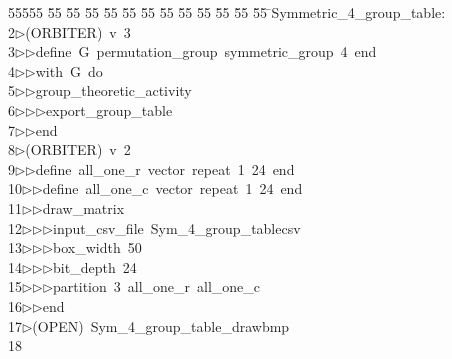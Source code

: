 %
%
\begin{tabbing}
55555 \= 55 \= 55 \= 55 \= 55 \= 55 \= 55 \= 55 \= 55 \= 55 \= 55 \= 55 \= 55 \= \>Symmetric\_4\_group\_table:\\[0pt]
2\>$\triangleright$\>(ORBITER)\ v\ 3\ \\[0pt]
3\>$\triangleright$\>$\triangleright$\>define\ G\ permutation\_group\ symmetric\_group\ 4\ end\ \\[0pt]
4\>$\triangleright$\>$\triangleright$\>with\ G\ do\ \\[0pt]
5\>$\triangleright$\>$\triangleright$\>group\_theoretic\_activity\ \\[0pt]
6\>$\triangleright$\>$\triangleright$\>$\triangleright$\>export\_group\_table\ \\[0pt]
7\>$\triangleright$\>$\triangleright$\>end\\[0pt]
8\>$\triangleright$\>(ORBITER)\ v\ 2\ \\[0pt]
9\>$\triangleright$\>$\triangleright$\>define\ all\_one\_r\ vector\ repeat\ 1\ 24\ end\ \\[0pt]
10\>$\triangleright$\>$\triangleright$\>define\ all\_one\_c\ vector\ repeat\ 1\ 24\ end\ \\[0pt]
11\>$\triangleright$\>$\triangleright$\>draw\_matrix\ \\[0pt]
12\>$\triangleright$\>$\triangleright$\>$\triangleright$\>input\_csv\_file\ Sym\_4\_group\_tablecsv\ \\[0pt]
13\>$\triangleright$\>$\triangleright$\>$\triangleright$\>box\_width\ 50\ \\[0pt]
14\>$\triangleright$\>$\triangleright$\>$\triangleright$\>bit\_depth\ 24\ \\[0pt]
15\>$\triangleright$\>$\triangleright$\>$\triangleright$\>partition\ 3\ all\_one\_r\ all\_one\_c\ \\[0pt]
16\>$\triangleright$\>$\triangleright$\>end\\[0pt]
17\>$\triangleright$\>(OPEN)\ Sym\_4\_group\_table\_drawbmp\\[0pt]
18\>\end{tabbing}
